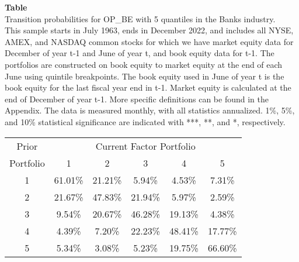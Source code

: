 \begin{table*}[ht!]
\raggedright
{}
\label{tab: transition_probs_OP_BE_Banks_with_5_quantiles}
\textbf{Table \thetable} \\
Transition probabilities for OP_BE with 5 quantiles in the Banks industry. \\
\hspace*{1em}This sample starts in July 1963, ends in December 2022, and includes all NYSE, AMEX, and NASDAQ common stocks for which we have market equity data for December of year t-1 and June of year t, and book equity data for t-1. The portfolios are constructed on book equity to market equity at the end of each June using quintile breakpoints.  The book equity used in June of year t is the book equity for the last fiscal year end in t-1.  Market equity is calculated at the end of December of year t-1.  More specific definitions can be found in the Appendix.  The data is measured monthly, with all statistics annualized.  1\%, 5\%, and 10\% statistical significance are indicated with ***, **, and *, respectively. \\
\vspace{0.5em}
\centering
\begin{adjustbox}{max width=\textwidth}
\begin{tabular}{@{}cccccc@{}}
\toprule
Prior & \multicolumn{5}{c}{Current Factor Portfolio} \\
Portfolio & 1 & 2 & 3 & 4 & 5 \\
\midrule
1 & 61.01\% & 21.21\% & 5.94\% & 4.53\% & 7.31\% \\
2 & 21.67\% & 47.83\% & 21.94\% & 5.97\% & 2.59\% \\
3 & 9.54\% & 20.67\% & 46.28\% & 19.13\% & 4.38\% \\
4 & 4.39\% & 7.20\% & 22.23\% & 48.41\% & 17.77\% \\
5 & 5.34\% & 3.08\% & 5.23\% & 19.75\% & 66.60\% \\
\bottomrule
\end{tabular}
\end{adjustbox}
\end{table*}